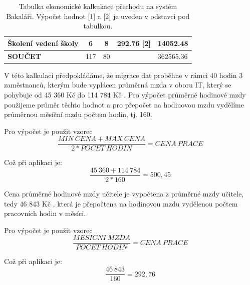 \documentclass[FM,Proj]{tulthesis}
\begin{document}
\begin{table}[]
\begin{tabular}{lcccc}
    \textbf{Školení vedení školy}                                                            & 6                                                                        & 8                                                                & 292.76 {[}2{]}                                                               & 14052.48                                                                   \\ \hline
    \textbf{SOUČET}                                                                          & 117                                                                      & 80                                                               & \multicolumn{1}{l}{}                                                         & \multicolumn{1}{l}{362565.36}                                             
    \end{tabular}
    
    \caption{Tabulka ekonomické kalkukace přechodu na systém Bakaláři. Výpočet hodnot
    [1] a [2] je uveden v odstavci pod tabulkou.}
    \label{analysis:ekonomicka-kalkulace-prechod-bakalari}

\end{table}



V této kalkulaci předpokládáme, že migrace dat proběhne v rámci 40 hodin 3 zaměstnanců,
kterým bude vyplácen průměrná mzda v oboru IT, který se pohybuje od 45 360 Kč do
114 784 Kč \cite{platy-it}. Pro výpočet průměrné hodinové mzdy použijeme průměr těchto
hodnot a pro přepočet na hodinovou mzdu vydělíme průměrnou měsíční mzdu počtem hodin,
tj. 160.

\begin{samepage}
Pro výpočet je použit vzorec
$$\frac{MIN\ CENA + MAX\ CENA}{2*POCET\ HODIN} = CENA\ PRACE$$

Což při aplikaci je:
$$\frac{45\ 360 + 114\ 784}{2*160} = 500,45$$
\end{samepage}

Cena průměrné hodinové mzdy učitele je vypočtena z průměrné mzdy učitele, tedy 46 843 Kč
\cite{platy-skolstvi}, která je přepočtena na hodinovou mzdu vydělenou počtem pracovních
hodin v měsíci.

\begin{samepage}
    Pro výpočet je použit vzorec
    $$\frac{MESICNI\ MZDA}{POCET\ HODIN} = CENA\ PRACE$$
    
    Což při aplikaci je:
    $$\frac{46\ 843}{160} = 292,76$$
\end{samepage}
\end{document}
